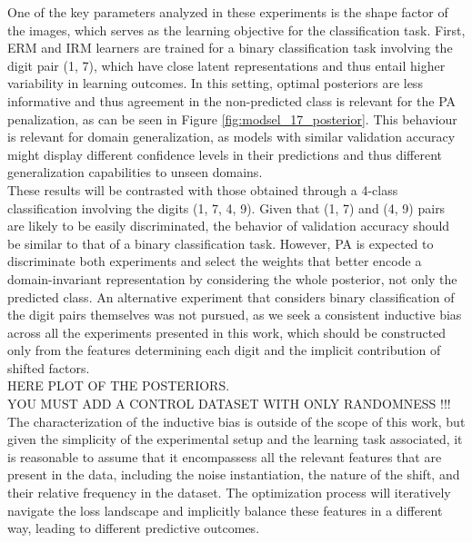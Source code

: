 One of the key parameters analyzed in these experiments is the shape factor of the images, which 
serves as the learning objective for the classification task. First, ERM and IRM learners are 
trained for a binary classification task involving the digit pair (1, 7), which have 
close latent representations and thus entail higher variability in learning outcomes. In this 
setting, optimal posteriors are less informative and thus agreement in the non-predicted
class is relevant for the PA penalization, as can be seen in Figure \ref{fig:modsel_17_posterior}. 
This behaviour is relevant for domain generalization, as models with similar validation accuracy 
might display different confidence levels in their
predictions and thus different generalization capabilities to unseen domains. \\

These results will be contrasted with those obtained through a 4-class classification 
involving the digits (1, 7, 4, 9). Given that (1, 7) and (4, 9) pairs are likely to be easily
discriminated, the behavior of validation accuracy should be similar to that of a binary 
classification task. However, PA is expected to discriminate both experiments and select the 
weights that better encode a domain-invariant representation by considering the whole posterior, 
not only the predicted class. An alternative experiment that considers binary classification of 
the digit pairs themselves was not pursued, as we seek a consistent inductive bias across all
the experiments presented in this work, which should be constructed only from the features 
determining each digit and the implicit contribution of shifted factors. \\

HERE PLOT OF THE POSTERIORS. \\

YOU MUST ADD A CONTROL DATASET WITH ONLY RANDOMNESS !!! \\

The characterization of the inductive bias is outside of the scope of this work, but given the
simplicity of the experimental setup and the learning task associated, it is reasonable to assume 
that it encompassess all the relevant features that are present in the data,
including the noise instantiation, the nature of the shift, and their relative frequency in the
dataset. The optimization process will iteratively navigate the loss landscape and implicitly
balance these features in a different way, leading to different predictive outcomes.  \\

